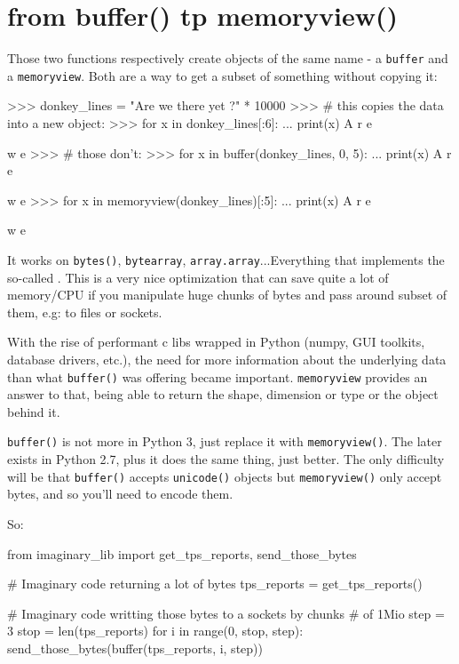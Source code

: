 \section{from buffer() tp memoryview()}

Those two functions respectively create objects of the same name - a \lstinline{buffer} and a \lstinline{memoryview}. Both are a way to get a subset of something without copying it:

\begin{py2}
>>> donkey_lines = "Are we there yet ?\n" * 10000
>>> # this copies the data into a new object:
>>> for x in donkey_lines[:6]:
...    print(x)
A
r
e

w
e
>>> # those don't:
>>> for x in buffer(donkey_lines, 0, 5):
...    print(x)
A
r
e

w
e
>>> for x in memoryview(donkey_lines)[:5]:
...    print(x)
A
r
e

w
e
\end{py2}

It works on \lstinline{bytes()}, \lstinline{bytearray}, \lstinline{array.array}...Everything that implements the so-called . This is a very nice optimization that can save quite a lot of memory/CPU if you manipulate huge chunks of bytes and pass around subset of them, e.g: to files or sockets.

With the rise of performant c libs wrapped in Python (numpy, GUI toolkits, database drivers, etc.), the need for more information about the underlying data than what \lstinline{buffer()} was offering became important. \lstinline{memoryview} provides an answer to that, being able to return the shape, dimension or type or the object behind it.

\lstinline{buffer()} is not more in Python 3, just replace it with \lstinline{memoryview()}. The later exists in Python 2.7, plus it does the same thing, just better. The only difficulty will be that \lstinline{buffer()} accepts \lstinline{unicode()} objects but \lstinline{memoryview()} only accept bytes, and so you'll need to encode them.

So:

\begin{py2}
from imaginary_lib import get_tps_reports, send_those_bytes

# Imaginary code returning a lot of bytes
tps_reports = get_tps_reports()

# Imaginary code writting those bytes to a sockets by chunks
# of 1Mio
step = 3
stop = len(tps_reports)
for i in range(0, stop, step):
    send_those_bytes(buffer(tps_reports, i, step))

\end{py2}

